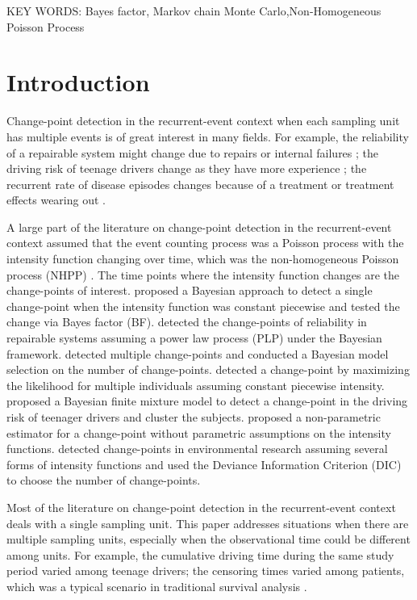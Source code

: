 \documentclass[12pt]{article}
\numberwithin{equation}{section}
\begin{document}
\vspace*{.3in}

\noindent KEY WORDS: {Bayes factor, Markov chain Monte Carlo,Non-Homogeneous Poisson Process}
\section{Introduction}
Change-point detection in the recurrent-event context when each sampling unit has multiple events is of great interest in many fields. For example, the reliability of a repairable system might change due to repairs or internal failures \citep{Ruggeri2005}; the driving risk of teenage drivers change as they have more experience \citep{Li2017a}; the recurrent rate of disease episodes changes because of a treatment or treatment effects wearing out \citep{Frobish2009}. 

A large part of the literature on change-point detection in the recurrent-event context assumed that the event counting process was a Poisson process with the intensity function changing over time, which was the non-homogeneous Poisson process (NHPP) \citep[p.~32]{Ross2006}. The time points where the intensity function changes are the change-points of interest. \citet{Raftery1986,Gupta2015} proposed a Bayesian approach to detect a single change-point when the intensity function was constant piecewise and tested the change via Bayes factor (BF).  \citet{Ruggeri2005} detected the change-points of reliability in repairable systems assuming a power law process (PLP) under the Bayesian framework. \citet{Achcar2007, Montoya2017} detected multiple change-points and conducted a Bayesian model selection on the number of change-points.  \citet{Frobish2009, Li2017a} detected a change-point by maximizing the likelihood for multiple individuals assuming constant piecewise intensity.  \citet{Li2017b} proposed a Bayesian finite mixture model to detect a change-point in the driving risk of teenager drivers and cluster the subjects.  \citet{Frobish2016} proposed a non-parametric estimator for a change-point without parametric assumptions on the intensity functions. \citet{Cruz2016,Achcar2016} detected change-points in environmental research assuming several forms of intensity functions and used the Deviance Information Criterion (DIC) to choose the number of change-points. 

Most of the literature on change-point detection in the recurrent-event context deals with a single sampling unit. This paper addresses situations when there are multiple sampling units, especially when the observational time could be different among units. For example, the cumulative driving time during the same study period \citep{Li2017a} varied among teenage drivers;  the censoring times varied among patients, which was a typical scenario in traditional survival analysis \citep{Frobish2009}.     
\end{document}
